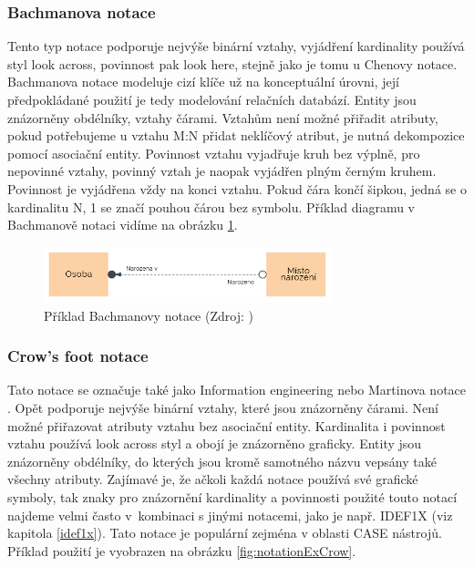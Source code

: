 \documentclass[czech,bachelor,public,dept460,male,oneside]{diploma}
\begin{document}
		\subsubsection{Bachmanova notace} \label{bachman}
		Tento typ notace podporuje nejvýše binární vztahy, vyjádření kardinality používá styl look across, povinnost pak look here, stejně jako je tomu u Chenovy notace. Bachmanova notace \cite{compErNotations} modeluje cizí klíče už na konceptuální úrovni, její předpokládané použití je tedy modelování relačních databází. Entity jsou znázorněny obdélníky, vztahy čárami. Vztahům není možné přiřadit atributy, pokud potřebujeme u vztahu M:N přidat neklíčový atribut, je nutná dekompozice pomocí asociační entity. Povinnost vztahu vyjadřuje kruh bez výplně, pro nepovinné vztahy, povinný vztah je naopak vyjádřen plným černým kruhem. Povinnost je vyjádřena vždy na konci vztahu. Pokud čára končí šipkou, jedná se o kardinalitu N, 1 se značí pouhou čárou bez symbolu. Příklad diagramu v Bachmanově notaci vidíme na obrázku \ref{fig:notationExBachman}.
		
		\begin{figure}[!h]
			\centering
			\includegraphics[width=0.75\textwidth]{Figures/NotationExBachman}
			\caption[Příklad Bachmanovy notace]{Příklad Bachmanovy notace (Zdroj: \cite{whatIsERD})}
			\label{fig:notationExBachman}
		\end{figure}
		
		\subsubsection{Crow's foot notace} \label{crowsfoot}
		Tato notace se označuje také jako Information engineering nebo Martinova notace \cite{compErNotations}. Opět podporuje nejvýše binární vztahy, které jsou znázorněny čárami. Není možné  přiřazovat atributy vztahu bez asociační entity. Kardinalita i povinnost vztahu používá look across styl a obojí je znázorněno graficky. Entity jsou znázorněny obdélníky, do kterých jsou kromě samotného názvu vepsány také všechny atributy. Zajímavé je, že ačkoli každá notace používá své grafické symboly, tak znaky pro znázornění kardinality a povinnosti použité touto notací najdeme velmi často v~kombinaci s jinými notacemi, jako je např. IDEF1X (viz kapitola \ref{idef1x}). Tato notace je populární zejména v oblasti CASE nástrojů. Příklad použití je vyobrazen na obrázku \ref{fig:notationExCrow}.
		
\end{document}
